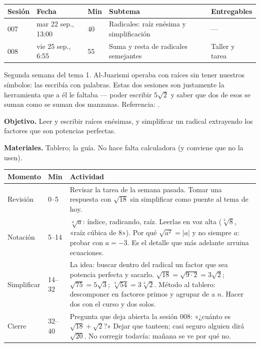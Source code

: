 \documentclass[11pt]{article}
\begin{document}
\encabezado*

\begin{center}
{\renewcommand{\arraystretch}{1.3}
\begin{tabularx}{\linewidth}{@{}l l l X l@{}}
  \toprule
  \textbf{Sesión} & \textbf{Fecha} & \textbf{Min} & \textbf{Subtema} & \textbf{Entregables}\\
  \midrule
  007 & mar 22 sep., 13:00 & 40 & Radicales: raíz enésima y simplificación & ---\\
  008 & vie 25 sep., 6:55 & 55 & Suma y resta de radicales semejantes & Taller y tarea\\
  \bottomrule
\end{tabularx}}
\end{center}

Segunda semana del tema 1. Al-Juarismi operaba con raíces sin tener nuestros símbolos: las
escribía con palabras. Estas dos sesiones son justamente la herramienta que a él le faltaba —
poder escribir $5\sqrt{2}$ y saber que dos de esos se suman como se suman dos manzanas.
Referencia: .


\textbf{Objetivo.} Leer y escribir raíces enésimas, y simplificar un radical extrayendo los
factores que son potencias perfectas.

\textbf{Materiales.} Tablero; la guía. No hace falta calculadora (y conviene que no la usen).

\begin{center}
{\renewcommand{\arraystretch}{1.3}
\begin{tabularx}{\linewidth}{@{}l l X@{}}
  \toprule
  \textbf{Momento} & \textbf{Min} & \textbf{Actividad}\\
  \midrule
  Revisión & 0--5 & Revisar la tarea de la semana pasada. Tomar una respuesta con
    $\sqrt{18}$ sin simplificar como puente al tema de hoy.\\
  Notación & 5--14 & $\sqrt[n]{a}$: índice, radicando, raíz. Leerlas en voz alta
    ($\sqrt[3]{8}$, «raíz cúbica de 8»). Por qué $\sqrt{a^2} = |a|$ y no siempre $a$: probar
    con $a = -3$. Es el detalle que más adelante arruina ecuaciones.\\
  Simplificar & 14--32 & La idea: buscar dentro del radical un factor que sea potencia
    perfecta y sacarlo. $\sqrt{18} = \sqrt{9 \cdot 2} = 3\sqrt{2}$;
    $\sqrt{75} = 5\sqrt{3}$; $\sqrt[3]{54} = 3\sqrt[3]{2}$. Método al tablero:
    descomponer en factores primos y agrupar de a $n$. Hacer dos con el curso y dos solos.\\
  Cierre & 32--40 & Pregunta que deja abierta la sesión 008: «¿cuánto es
    $\sqrt{18} + \sqrt{2}$?» Dejar que tanteen; casi seguro alguien dirá $\sqrt{20}$.
    No corregir todavía: mañana se ve por qué no.\\
  \bottomrule
\end{tabularx}}
\end{center}
\end{document}
